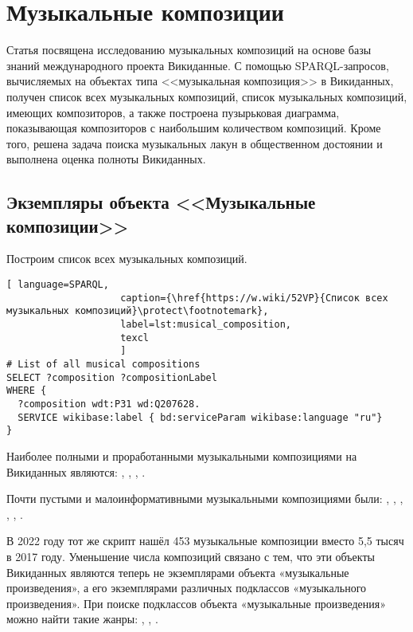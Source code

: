\chapter{Музыкальные композиции}
\label{ch:musical-composition}
Статья посвящена исследованию музыкальных композиций на основе базы знаний международного проекта Викиданные. С помощью SPARQL-запросов, вычисляемых на объектах типа <<музыкальная композиция>> в Викиданных, получен список всех музыкальных композиций, список музыкальных композиций, имеющих композиторов, а также построена пузырьковая диаграмма, показывающая композиторов с наибольшим количеством композиций. Кроме того, решена задача поиска музыкальных лакун в общественном достоянии и выполнена оценка полноты Викиданных.

\section{Экземпляры объекта <<Музыкальные композиции>>}

Построим список всех музыкальных композиций.

\begin{lstlisting}[ language=SPARQL,
                    caption={\href{https://w.wiki/52VP}{Список всех  музыкальных композиций}\protect\footnotemark},
                    label=lst:musical_composition,
                    texcl 
                    ]
# List of all musical compositions
SELECT ?composition ?compositionLabel 
WHERE {
  ?composition wdt:P31 wd:Q207628.
  SERVICE wikibase:label { bd:serviceParam wikibase:language "ru"}
}
\end{lstlisting}%

Наиболее полными и проработанными музыкальными композициями на Викиданных являются: , , , .

Почти пустыми и малоинформативными музыкальными композициями были: , , , , , .

В 2022 году тот же скрипт нашёл 453 музыкальные композиции вместо 5,5 тысяч в 2017 году. Уменьшение числа композиций связано с тем, что эти объекты Викиданных являются теперь не экземплярами объекта «музыкальные произведения», а его экземплярами различных подклассов «музыкального произведения». При поиске подклассов объекта «музыкальные произведения» можно найти такие жанры: , , .

